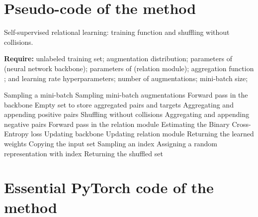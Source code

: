 \documentclass{article}
\begin{document}
\section{Pseudo-code of the method}\label{appendix:code}
\FloatBarrier

\begin{algorithm}[H]
\caption{Self-supervised relational learning: training function and shuffling without collisions.}
\label{alg:overview}
\textbf{Require:}   unlabeled training set;  augmentation distribution;  parameters of  (neural network backbone);  parameters of  (relation module); aggregation function ;  and  learning rate hyperparameters;  number of augmentations;  mini-batch size;\\
\begin{algorithmic}[1]
    \State  \Comment Sampling a mini-batch
        \State  \Comment Sampling  mini-batch augmentations
        \State  \Comment Forward pass in the backbone
    \EndFor
    \State  \Comment Empty set to store aggregated pairs and targets
            \State  \Comment Aggregating and appending positive pairs
            \State  {} \Comment Shuffling without collisions
            \State  \Comment Aggregating and appending negative pairs
       \EndFor 
    \EndFor
    \State  \Comment Forward pass in the relation module
    \State  \Comment Estimating the Binary Cross-Entropy loss
    \State  \Comment Updating backbone
    \State  \Comment Updating relation module
\EndWhile
\State \Return{} \Comment Returning the learned weights
\EndFunction
\vspace{0.25cm} 
    \State  \Comment Copying the input set
        \State  \Comment Sampling an index 
        \State  \Comment Assigning a random representation with index 
    \EndFor
    \State \Return{} \Comment Returning the shuffled set
\EndFunction
\Statex
\end{algorithmic}
  \vspace{-0.2cm}\end{algorithm}

\section{Essential PyTorch code of the method}\label{appendix:code_python}
\FloatBarrier



\end{document}
